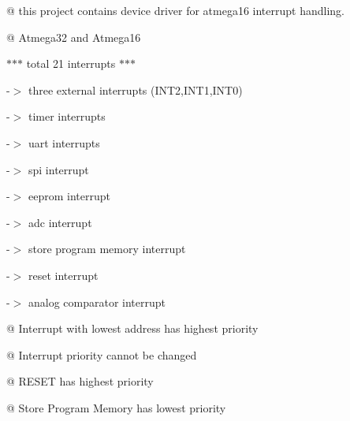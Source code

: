 @ this project contains device driver for atmega16 interrupt handling.

@ Atmega32 and Atmega16

$\ast$$\ast$$\ast$ total 21 interrupts $\ast$$\ast$$\ast$

-\/$>$ three external interrupts (INT2,INT1,INT0)

-\/$>$ timer interrupts

-\/$>$ uart interrupts

-\/$>$ spi interrupt

-\/$>$ eeprom interrupt

-\/$>$ adc interrupt

-\/$>$ store program memory interrupt

-\/$>$ reset interrupt

-\/$>$ analog comparator interrupt

@ Interrupt with lowest address has highest priority

@ Interrupt priority cannot be changed

@ RESET has highest priority

@ Store Program Memory has lowest priority 